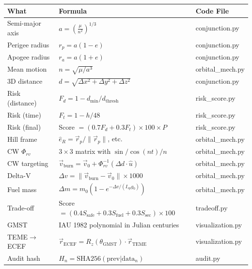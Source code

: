 \documentclass[12pt,a4paper]{article}
\begin{document}
\begin{center}
\renewcommand{\arraystretch}{1.8}
\begin{longtable}{p{3.5cm} p{9cm} p{2.5cm}}
\toprule
\textbf{What} & \textbf{Formula} & \textbf{Code File} \\
\midrule
\endhead
Semi-major axis & $a = \left(\frac{\mu}{n^2}\right)^{1/3}$ & conjunction.py \\
Perigee radius & $r_p = a(1-e)$ & conjunction.py \\
Apogee radius & $r_a = a(1+e)$ & conjunction.py \\
Mean motion & $n = \sqrt{\mu / a^3}$ & orbital\_mech.py \\
3D distance & $d = \sqrt{\Delta x^2 + \Delta y^2 + \Delta z^2}$ & conjunction.py \\
Risk (distance) & $F_d = 1 - d_{\min}/d_{\text{thresh}}$ & risk\_score.py \\
Risk (time) & $F_t = 1 - h/48$ & risk\_score.py \\
Risk (final) & Score $= (0.7 F_d + 0.3 F_t) \times 100 \times P$ & risk\_score.py \\
Hill frame & $\hat{e}_R = \vec{r}_p / \|\vec{r}_p\|$, etc. & orbital\_mech.py \\
CW $\Phi_{rv}$ & $3 \times 3$ matrix with $\sin/\cos(nt)/n$ & orbital\_mech.py \\
CW targeting & $\vec{v}_{\text{burn}} = \vec{v}_0 + \Phi_{rv}^{-1}(\Delta d \cdot \hat{u})$ & orbital\_mech.py \\
Delta-V & $\Delta v = \|\vec{v}_{\text{burn}} - \vec{v}_0\| \times 1000$ & orbital\_mech.py \\
Fuel mass & $\Delta m = m_0(1 - e^{-\Delta v / (I_{sp} g_0)})$ & orbital\_mech.py \\
Trade-off & Score $= (0.4 S_{\text{safe}} + 0.3 S_{\text{fuel}} + 0.3 S_{\text{sec}}) \times 100$ & tradeoff.py \\
GMST & IAU 1982 polynomial in Julian centuries & visualization.py \\
TEME$\to$ECEF & $\vec{r}_{\text{ECEF}} = R_z(\theta_{\text{GMST}}) \cdot \vec{r}_{\text{TEME}}$ & visualization.py \\
Audit hash & $H_n = \text{SHA256}(\text{prev} | \text{data}_n)$ & audit.py \\
\bottomrule
\end{longtable}
\end{center}

\end{document}
